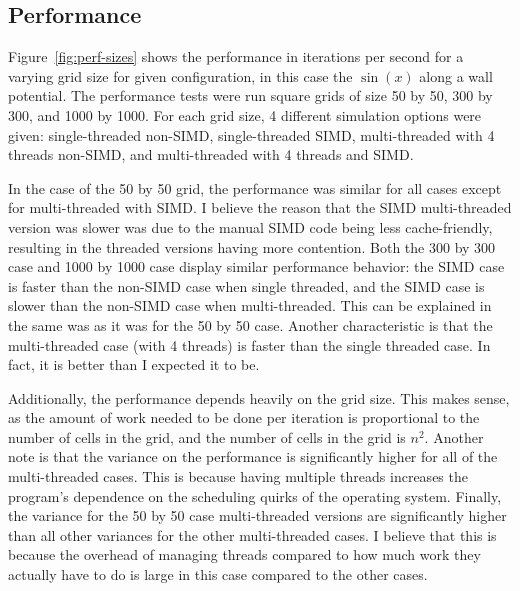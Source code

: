 \subsection{Performance}


Figure~\ref{fig:perf-sizes} shows the performance in iterations per second for a varying grid size for given
configuration, in this case the $\sin(x)$ along a wall potential. The performance tests were run square grids
of size 50 by 50, 300 by 300, and 1000 by 1000. For each grid size, 4 different simulation options were given:
single-threaded non-SIMD, single-threaded SIMD, multi-threaded with 4 threads non-SIMD, and multi-threaded
with 4 threads and SIMD.

In the case of the 50 by 50 grid, the performance was similar for all cases
except for multi-threaded with SIMD. I believe the reason that the SIMD multi-threaded version was slower was
due to the manual SIMD code being less cache-friendly, resulting in the threaded versions having more contention.
Both the 300 by 300 case and 1000 by 1000 case display similar performance behavior: the SIMD case is faster than
the non-SIMD case when single threaded, and the SIMD case is slower than the non-SIMD case when multi-threaded.
This can be explained in the same was as it was for the 50 by 50 case. Another characteristic is that the multi-threaded
case (with 4 threads) is faster than the single threaded case. In fact, it is better than I expected it to be.

Additionally, the performance depends heavily on the grid size. This makes sense, as the amount of work needed to be
done per iteration is proportional to the number of cells in the grid, and the number of cells in the grid is $n^2$.
Another note is that the variance on the performance is significantly higher for all of the multi-threaded cases.
This is because having multiple threads increases the program's dependence on the scheduling quirks of the operating
system. Finally, the variance for the 50 by 50 case multi-threaded versions are significantly higher than all other
variances for the other multi-threaded cases. I believe that this is because the overhead of managing threads compared
to how much work they actually have to do is large in this case compared to the other cases.


